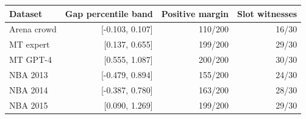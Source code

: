 \begin{tabular}{lrrr}
\toprule
Dataset & Gap percentile band & Positive margin & Slot witnesses \\
\midrule
Arena crowd & [-0.103, 0.107] & 110/200 & 16/30 \\
MT expert & [0.137, 0.655] & 199/200 & 29/30 \\
MT GPT-4 & [0.555, 1.087] & 200/200 & 30/30 \\
NBA 2013 & [-0.479, 0.894] & 155/200 & 24/30 \\
NBA 2014 & [-0.387, 0.780] & 163/200 & 28/30 \\
NBA 2015 & [0.090, 1.269] & 199/200 & 29/30 \\
\bottomrule
\end{tabular}
